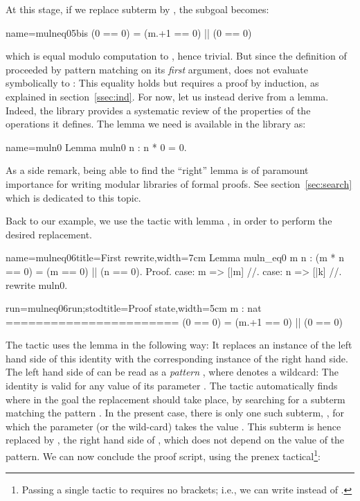At this stage, if we replace subterm  by , the
subgoal becomes:

\begin{coq}{name=mulneq05bis}{}
(0 == 0) = (m.+1 == 0) || (0 == 0)
\end{coq}
which is equal modulo computation to , hence trivial.
But since
the definition of  proceeded by pattern matching on its \emph{first}
argument,  does not evaluate symbolically to : This
equality holds but requires a proof by induction, as explained in
section~\ref{ssec:ind}.
For now, let us instead derive  from a lemma.
Indeed, the \mcbMC{} library provides a systematic review of the
properties of the operations it defines. The lemma we need is
available in the library as:

\begin{coq}{name=muln0}{}
Lemma muln0 n : n * 0 = 0.
\end{coq}

As a side remark, being able to find the ``right'' lemma is of
paramount importance for writing modular libraries of formal
proofs. See section~\ref{sec:search} which is dedicated to this topic.

Back to our example, we use the  tactic with lemma
, in order to perform the desired replacement.

\begin{coq-left}{name=mulneq06}{title=First rewrite,width=7cm}
Lemma muln_eq0 m n :
  (m * n == 0) = (m == 0) || (n == 0).
Proof.
case: m => [|m] //.
case: n => [|k] //.
rewrite muln0.
\end{coq-left}
\begin{coqout-right}{run=mulneq06run;stod}{title=Proof state,width=5cm}
m : nat
=======================
(0 == 0) =
  (m.+1 == 0) || (0 == 0)
\end{coqout-right}

The  tactic uses the  lemma in the following way:
It replaces an instance of the left hand side of this identity with the
corresponding instance of the right hand side. The left hand side of
 can be read as a \emph{pattern} , where \C{_}
denotes a wildcard: The identity is
valid for any value of its parameter . The tactic
automatically  finds  where in the goal the replacement should take
place, by searching for a subterm matching the pattern .
In the present case, there is only one such subterm,
, for which the parameter (or the wild-card) takes the
value . This subterm is hence replaced by , the right
hand side of , which does not depend on the value of the
pattern. We can now conclude the proof script, using the
prenex  tactical\footnote{Passing a single tactic to
 requires no brackets; i.e., we can write
 instead of .}:

